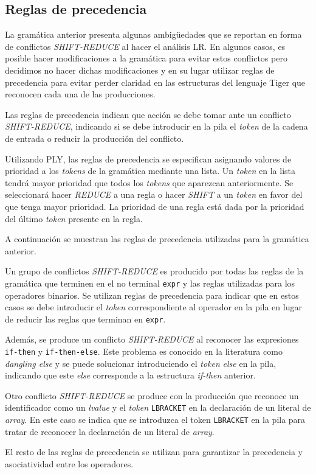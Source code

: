 \documentclass{article}
\begin{document}
\subsection{Reglas de precedencia}

La gramática anterior presenta algunas ambigüedades que se reportan en forma de
conflictos \emph{SHIFT-REDUCE} al hacer el análisis LR. En algunos casos,
es posible hacer modificaciones a la gramática para evitar estos conflictos
pero decidimos no hacer dichas modificaciones y en su lugar utilizar reglas
de precedencia para evitar perder claridad en las estructuras del lenguaje
Tiger que reconocen cada una de las producciones.

Las reglas de precedencia indican que acción se debe tomar ante un conflicto
\emph{SHIFT-REDUCE}, indicando si se debe introducir en la pila el
\emph{token} de la cadena de entrada o reducir la producción del conflicto.

Utilizando PLY, las reglas de precedencia se especifican asignando valores
de prioridad a los \emph{tokens} de la gramática mediante una lista. Un
\emph{token} en la lista tendrá mayor prioridad que todos los \emph{tokens} que
aparezcan anteriormente. Se seleccionará hacer \emph{REDUCE} a una regla o hacer
\emph{SHIFT} a un \emph{token} en favor del que tenga mayor prioridad. La
prioridad de una regla está dada por la prioridad del último \emph{token}
presente en la regla.

A continuación se muestran las reglas de precedencia utilizadas para la
gramática anterior.

\begin{quote}

\end{quote}

Un grupo de conflictos \emph{SHIFT-REDUCE} es producido por todas las reglas
de la gramática que terminen en el no terminal \verb|expr| y las reglas
utilizadas para los operadores binarios. Se utilizan reglas de precedencia
para indicar que en estos casos se debe introducir el \emph{token} correspondiente
al operador en la pila en lugar de reducir las reglas que terminan en \verb|expr|.

Además, se produce un conflicto \emph{SHIFT-REDUCE} al reconocer las expresiones
\texttt{if-then} y \texttt{if-then-else}. Este problema es conocido en la
literatura como \emph{dangling else} y se puede solucionar introduciendo el
\emph{token} \emph{else} en la pila, indicando que este \emph{else} corresponde
a la estructura \emph{if-then} anterior.

Otro conflicto \emph{SHIFT-REDUCE} se produce con la producción que reconoce un
identificador como un \emph{lvalue} y el \emph{token} \verb|LBRACKET| en la
declaración de un literal de \emph{array}. En este caso se indica que se introduzca
el token \verb|LBRACKET| en la pila para tratar de reconocer la declaración de
un literal de \emph{array}.

El resto de las reglas de precedencia se utilizan para garantizar la precedencia
y asociatividad entre los operadores.
\end{document}
